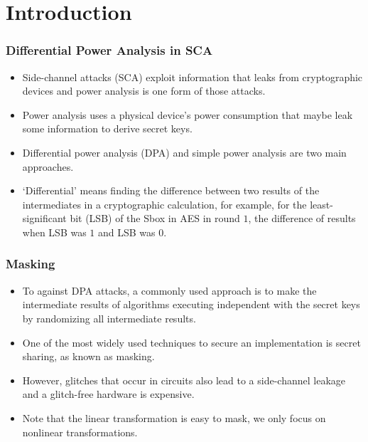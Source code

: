 \documentclass[
    aspectratio=169,                   %
]{beamer}
\begin{document}
\section{Introduction}
    \begin{frame}
        \frametitle{Differential Power Analysis in SCA}
        \begin{itemize}
            \item Side-channel attacks (SCA) exploit information that leaks from cryptographic devices 
            and power analysis is one form of those attacks.
            \item Power analysis uses a physical device's power consumption that maybe leak some information to derive secret keys.
            \item Differential power analysis (DPA) and simple power analysis are two main approaches.
            \item `Differential' means finding the difference between two results of the intermediates in a cryptographic calculation, 
            for example, for the least-significant bit (LSB) of the Sbox in AES in round $ 1 $, the difference 
            of results when LSB was $ 1 $ and LSB was $ 0 $. 
        \end{itemize}

    \end{frame}

    \begin{frame}
        \frametitle{Masking}
        \begin{itemize}
            \item To against DPA attacks, a commonly used approach is to make the intermediate results of algorithms executing independent with the secret keys by randomizing all intermediate results.
            \item One of the most widely used techniques to secure an implementation is secret sharing, 
            as known as masking.
            \item However, glitches that occur in circuits also lead to a side-channel leakage and a glitch-free hardware is expensive.  
            \item Note that the linear transformation is easy to mask, we only focus on nonlinear transformations. 
        \end{itemize}
    \end{frame}
\end{document}
